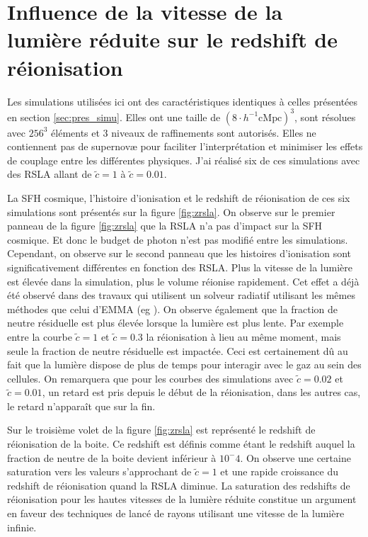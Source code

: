 

\clearpage 
\section{Influence de la vitesse de la lumière réduite sur le redshift de réionisation}

Les simulations utilisées ici ont des caractéristiques identiques à celles présentées en section \ref{sec:pres_simu}.
Elles ont une taille de $\left( 8 \cdot h^{-1} \mathrm{cMpc } \right)^3$, sont résolues avec $256^3$ éléments et 3 niveaux de raffinements sont autorisés.
Elles ne contiennent pas de supernovæ pour faciliter l'interprétation et minimiser les effets de couplage entre les différentes physiques.
J'ai réalisé six de ces simulations avec des \ac{RSLA} allant de $\tilde{c}=1$ à $\tilde{c}=0.01$.

La \ac{SFH} cosmique, l'histoire d'ionisation et le redshift de réionisation de ces six simulations sont présentés sur la figure \ref{fig:zrsla}.
On observe sur le premier panneau de la figure \ref{fig:zrsla} que la \ac{RSLA} n'a pas d'impact sur la \ac{SFH} cosmique.
Et donc le budget de photon n'est pas modifié entre les simulations.
Cependant, on observe sur le second panneau que les histoires d'ionisation sont significativement différentes en fonction des \ac{RSLA}.
Plus la vitesse de la lumière est élevée dans la simulation, plus le volume réionise rapidement.
Cet effet a déjà été observé dans des travaux qui utilisent un solveur radiatif utilisant les mêmes méthodes que celui d'EMMA (eg \cite{rosdahl_ramsesrt_2013}).
On observe également que la fraction de neutre résiduelle est plus élevée lorsque la lumière est plus lente.
Par exemple entre la courbe $\tilde{c}=1$ et $\tilde{c}=0.3$ la réionisation à lieu au même moment, mais seule la fraction de neutre résiduelle est impactée.
Ceci est certainement dû au fait que la lumière dispose de plus de temps pour interagir avec le gaz au sein des cellules.
On remarquera que pour les courbes des simulations avec $\tilde{c}=0.02$ et $\tilde{c}=0.01$, un retard est pris depuis le début de la réionisation, dans les autres cas, le retard n’apparaît que sur la fin.

Sur le troisième volet de la figure \ref{fig:zrsla} est représenté le redshift de réionisation de la boite.
Ce redshift est définis comme étant le redshift auquel la fraction de neutre de la boite devient inférieur à $10^-{4}$.
On observe une certaine saturation vers les valeurs s'approchant de $\tilde{c}=1$ et une rapide croissance du redshift de réionisation quand la \ac{RSLA} diminue.
La saturation des redshifts de réionisation pour les hautes vitesses de la lumière réduite constitue un argument en faveur des techniques de lancé de rayons utilisant une vitesse de la lumière infinie.

